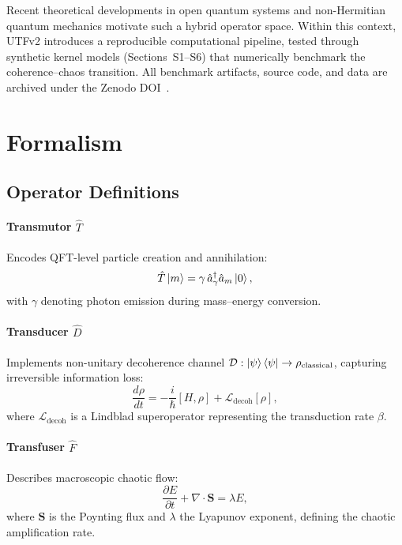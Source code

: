 \documentclass[11pt]{article}
\begin{document}
Recent theoretical developments in open quantum systems
and non-Hermitian quantum mechanics motivate such a hybrid operator space.
Within this context, UTFv2 introduces a reproducible computational
pipeline, tested through synthetic kernel models (Sections~S1–S6)
that numerically benchmark the coherence–chaos transition.
All benchmark artifacts, source code, and data are archived under the
Zenodo DOI~\cite{Pathania2024Quantum, Xu2019Extreme, MatsoukasRoubeas2024Quantum}.


\section{Formalism}
\subsection{Operator Definitions}
\paragraph{Transmutor $\hat{T}$}
Encodes QFT-level particle creation and annihilation:
\begin{equation}
    \hat{T}\ket{m} = \gamma\, \hat{a}^\dagger_{\gamma} \hat{a}_m \ket{0},
\end{equation}
with $\gamma$ denoting photon emission during mass–energy conversion.

\paragraph{Transducer $\hat{D}$}
Implements non-unitary decoherence channel
$\mathcal{D}: \ket{\psi}\bra{\psi} \rightarrow \rho_{\mathrm{classical}}$,
capturing irreversible information loss:
\begin{equation}
    \frac{d\rho}{dt} = -\frac{i}{\hbar}[H,\rho] + \mathcal{L}_{\mathrm{decoh}}[\rho],
\end{equation}
where $\mathcal{L}_{\mathrm{decoh}}$ is a Lindblad superoperator representing the
transduction rate $\beta$.

\paragraph{Transfuser $\hat{F}$}
Describes macroscopic chaotic flow:
\begin{equation}
    \frac{\partial E}{\partial t} + \nabla\cdot\bm{S} = \lambda E,
\end{equation}
where $\bm{S}$ is the Poynting flux and $\lambda$ the Lyapunov exponent,
defining the chaotic amplification rate.
\end{document}
